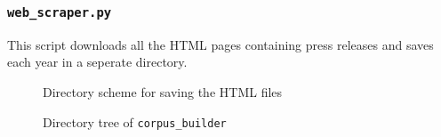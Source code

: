 \subsubsection{\texttt{web\_scraper.py}}
This script downloads all the HTML pages containing press releases and saves each year in a seperate directory.

\begin{figure}
\caption{Directory scheme for saving the HTML files}
\end{figure} 

\begin{figure}
\caption{Directory tree of \texttt{corpus\_builder}}
\end{figure} 
